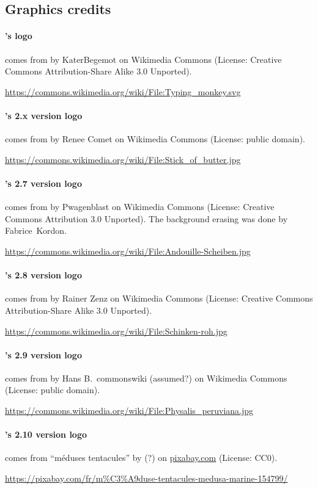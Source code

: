 \subsection*{Graphics credits}

\paragraph{\imitator{}'s logo} comes from  by KaterBegemot on Wikimedia Commons
	(License: Creative Commons Attribution-Share Alike 3.0 Unported).

\url{https://commons.wikimedia.org/wiki/File:Typing_monkey.svg}


\paragraph{\imitator{}'s 2.x version logo} comes from  by Renee Comet on Wikimedia Commons
	(License: public domain).

\url{https://commons.wikimedia.org/wiki/File:Stick_of_butter.jpg}

\paragraph{\imitator{}'s 2.7 version logo} comes from  by Pwagenblast on Wikimedia Commons
	(License: Creative Commons Attribution 3.0 Unported).
The background erasing was done by Fabrice~Kordon.

\url{https://commons.wikimedia.org/wiki/File:Andouille-Scheiben.jpg}


\paragraph{\imitator{}'s 2.8 version logo} comes from  by Rainer Zenz on Wikimedia Commons
	(License: Creative Commons Attribution-Share Alike 3.0 Unported).

\url{https://commons.wikimedia.org/wiki/File:Schinken-roh.jpg}


\paragraph{\imitator{}'s 2.9 version logo} comes from  by Hans B.~commonswiki (assumed?) on Wikimedia Commons
	(License: public domain).

\url{https://commons.wikimedia.org/wiki/File:Physalis_peruviana.jpg}
 

\paragraph{\imitator{}'s 2.10 version logo} comes from ``méduses tentacules'' by (?) on \url{pixabay.com}
	(License: CC0).

\url{https://pixabay.com/fr/m%C3%A9duse-tentacules-medusa-marine-154799/}
 

